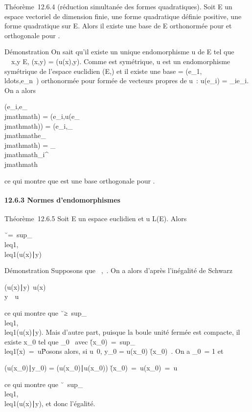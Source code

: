 \documentclass[]{article}
\begin{document}
Théorème~12.6.4 (réduction simultanée des formes quadratiques). Soit E
un ~ espace vectoriel de dimension finie, \Phi une forme quadratique
définie positive, \Psi une forme quadratique sur E. Alors il existe une
base  de E orthonormée pour \Phi et orthogonale pour \Psi.

Démonstration On sait qu'il existe un unique endomorphisme u de E tel
que \forall~~x,y \in E, \psi(x,y) = \phi(u(x),y). Comme \psi est
symétrique, u est un endomorphisme symétrique de l'espace euclidien
(E,\Phi) et il existe une base  =
(e_1,\\ldots,e_n~)
orthonormée pour \Phi formée de vecteurs propres de u~: u(e_i) =
\lambda_ie_i. On a alors

\psi(e_i,e_\\jmathmath) = \phi(e_i,u(e_\\jmathmath)) =
\phi(e_i,\lambda_\\jmathmathe_\\jmathmath) =
\lambda_\\jmathmath\delta_i^\\jmathmath

ce qui montre que  est une base orthogonale pour \psi.

\paragraph{12.6.3 Normes d'endomorphismes}

Théorème~12.6.5 Soit E un espace euclidien et u \in L(E). Alors

\u\
=\
sup_\x\\leq1,\y\(u(x)∣y)

Démonstration Supposons que
\x\ \leq
1,\y\ \leq 1. On a alors
d'après l'inégalité de Schwarz

(u(x)∣y)\leq\
u(x)\\y\
\leq\ u\

ce qui montre que \u\
≥\
sup_\x\\leq1,\y\\leq1(u(x)∣y).
Mais d'autre part, puisque la boule unité fermée est compacte, il existe
x_0 tel que
\x_0\ 
avec \u(x_0)\
=\
sup_\x\\leq1\u(x)\
=\ u\. Posons alors,
si u\neq~0, y_0 = u(x_0)
\over
\u(x_0)\ .
On a \y_0\ =
1 et

(u(x_0)∣y_0)
= (u(x_0)∣u(x_0))
\over
\u(x_0)\
=\ u(x_0)\
=\ u\

ce qui montre que \u\
\leq\
sup_\x\\leq1,\y\\leq1(u(x)∣y),
et donc l'égalité.
\end{document}
